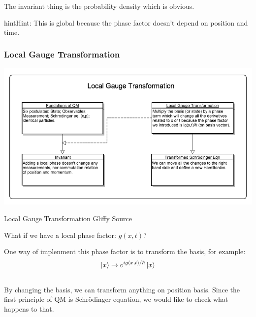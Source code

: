 \documentclass[letterpaper,10pt,english]{sphinxmanual}
\newcommand{\ket}[1]{\left| #1\right\rangle}
\begin{document}
The invariant thing is the probability density which is obvious.

\begin{notice}{hint}{Hint:}
This is global because the phase factor doesn't depend on position and time.
\end{notice}


\subsubsection{Local Gauge Transformation}
\label{symmetries:local-gauge-transformation}
\includegraphics{LocalGaugeTransformation.png}

Local Gauge Transformation Gliffy Source

What if we have a local phase factor: $g(x,t)$?

One way of implenment this phase factor is to transform the basis, for example:
\begin{gather}
\begin{split}\ket{x} \rightarrow e^{i g(x,t)/\hbar} \ket{x}\end{split}\notag\\\begin{split}\end{split}\notag
\end{gather}
By changing the basis, we can transform anything on position basis. Since the first principle of QM is Schrödinger equation, we would like to check what happens to that.
\end{document}
